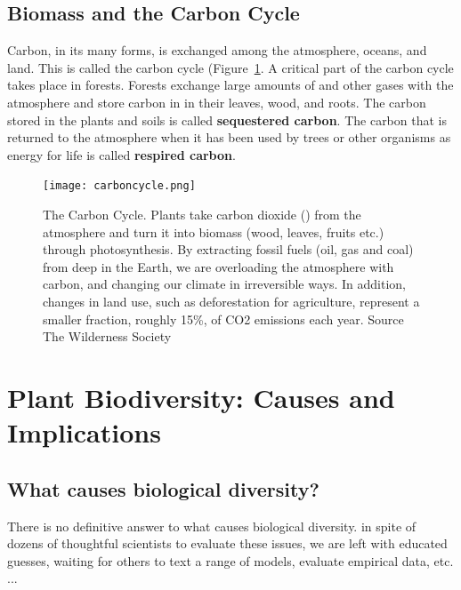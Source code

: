 \subsection{Biomass and the Carbon Cycle}



Carbon, in its many forms, is exchanged among the atmosphere, oceans, and land. This is called the carbon cycle (Figure~\ref{fig:carboncycle}. A critical part of the carbon cycle takes place in forests. Forests exchange large amounts of \CO and other gases with the atmosphere and store carbon in in their leaves, wood, and roots. The carbon stored in the plants and soils is called \textbf{sequestered carbon}. The carbon that is returned to the atmosphere when it has been used by trees or other organisms as energy for life is called \textbf{respired carbon}. 
  
 \begin{figure}[ht]
    \centering
		\caption{The Carbon Cycle. Plants take carbon dioxide (\CO) from the atmosphere and turn it into biomass (wood, leaves, fruits etc.) through photosynthesis. By extracting fossil fuels (oil, gas and coal) from deep in the Earth, we are overloading the atmosphere with carbon, and changing our climate in irreversible ways. In addition, changes in land use, such as deforestation for agriculture, represent a smaller fraction, roughly 15\%, of CO2 emissions each year. Source The Wilderness Society}
		\label{fig:carboncycle}
        \texttt{[image: carboncycle.png]}
\end{figure}

\section[Plant Biodiversity]{Plant Biodiversity: Causes and Implications}

\subsection{What causes biological diversity?}

There is no definitive answer to what causes biological diversity. in spite of dozens of thoughtful scientists to evaluate these issues, we are left with educated guesses, waiting for others to text a range of models, evaluate empirical data, etc. ...

